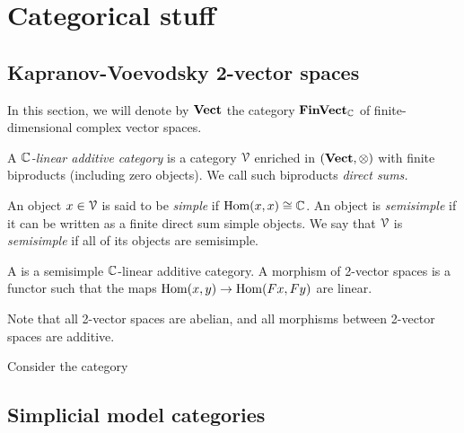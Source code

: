 \documentclass[main.tex]{subfiles}
\begin{document}
\chapter{Categorical stuff}
\label{ch:categorical_stuff}

\section{Kapranov-Voevodsky 2-vector spaces}
\label{sec:kapranov_voevodsky_2_vector_spaces}

In this section, we will denote by $\mathbf{Vect}$ the category $\mathbf{FinVect}_{\mathbb{C}}$ of finite-dimensional complex vector spaces.

\begin{definition}
  \label{def:kapranov_voevodsky_2_vector_space}
  A \emph{$\mathbb{C}$-linear additive category} is a category $\mathcal{V}$ enriched in $(\mathbf{Vect}, \otimes)$ with finite biproducts (including zero objects). We call such biproducts \emph{direct sums.}

  An object $x \in \mathcal{V}$ is said to be \emph{simple} if $\mathrm{Hom}(x, x) \cong \mathbb{C}$. An object is \emph{semisimple} if it can be written as a finite direct sum simple objects. We say that $\mathcal{V}$ is \emph{semisimple} if all of its objects are semisimple.

  A  is a semisimple $\mathbb{C}$-linear additive category. A morphism of 2-vector spaces is a functor such that the maps $\mathrm{Hom}(x, y) \to \mathrm{Hom}(Fx, Fy)$ are linear.
\end{definition}

Note that all 2-vector spaces are abelian, and all morphisms between 2-vector spaces are additive.

\begin{example}
  Consider the category
\end{example}

\section{Simplicial model categories}
\label{sec:simplicial_model_categories}
\end{document}
